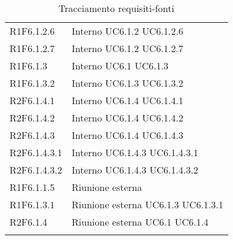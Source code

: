 \begin{longtable}{p{2.5cm}!{\VRule[1pt]}p{2.5cm}}
 \\
R1F6.1.2.6 & Interno \newline UC6.1.2
 \newline UC6.1.2.6
 \\
R1F6.1.2.7 & Interno \newline UC6.1.2
 \newline UC6.1.2.7
 \\
R1F6.1.3 & Interno \newline UC6.1
 \newline UC6.1.3
 \\
R1F6.1.3.2 & Interno \newline UC6.1.3
 \newline UC6.1.3.2
 \\
R2F6.1.4.1 & Interno \newline UC6.1.4
 \newline UC6.1.4.1
 \\
R2F6.1.4.2 & Interno \newline UC6.1.4
 \newline UC6.1.4.2
 \\
R2F6.1.4.3 & Interno \newline UC6.1.4
 \newline UC6.1.4.3
 \\
R2F6.1.4.3.1 & Interno \newline UC6.1.4.3
 \newline UC6.1.4.3.1
 \\
R2F6.1.4.3.2 & Interno \newline UC6.1.4.3
 \newline UC6.1.4.3.2
 \\
R1F6.1.1.5 & Riunione esterna \\
R1F6.1.3.1 & Riunione esterna \newline UC6.1.3
 \newline UC6.1.3.1
 \\
R2F6.1.4 & Riunione esterna \newline UC6.1
 \newline UC6.1.4
 \\
\caption{Tracciamento requisiti-fonti}
\end{longtable}